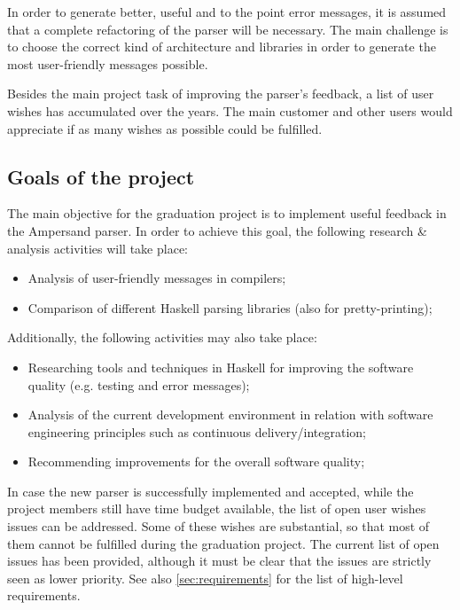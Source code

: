 In order to generate better, useful and to the point error messages, it is assumed that a complete refactoring of the parser will be necessary.
The main challenge is to choose the correct kind of architecture and libraries in order to generate the most user-friendly messages possible.

Besides the main project task of improving the parser's feedback, a list of user wishes has accumulated over the years.
The main customer and other users would appreciate if as many wishes as possible could be fulfilled.

\subsection{Goals of the project}
\label{subsec:project-goals}
The main objective for the graduation project is to implement useful feedback in the Ampersand parser.
In order to achieve this goal, the following research \& analysis activities will take place:
\begin{itemize}
	\item Analysis of user-friendly messages in compilers;
	\item Comparison of different Haskell parsing libraries (also for pretty-printing);
\end{itemize}
%
Additionally, the following activities may also take place:
\begin{itemize}
	\item Researching tools and techniques in Haskell for improving the software quality (e.g. testing and error messages);
	\item Analysis of the current development environment in relation with software engineering principles such as continuous delivery/integration;
	\item Recommending improvements for the overall software quality;
\end{itemize}
%
In case the new parser is successfully implemented and accepted, while the project members still have time budget available, the list of open user wishes issues can be addressed.
Some of these wishes are substantial, so that most of them cannot be fulfilled during the graduation project.
The current list of open issues has been provided\cite{open-issues}, although it must be clear that the issues are strictly seen as lower priority.
See also \autoref{sec:requirements} for the list of high-level requirements.

